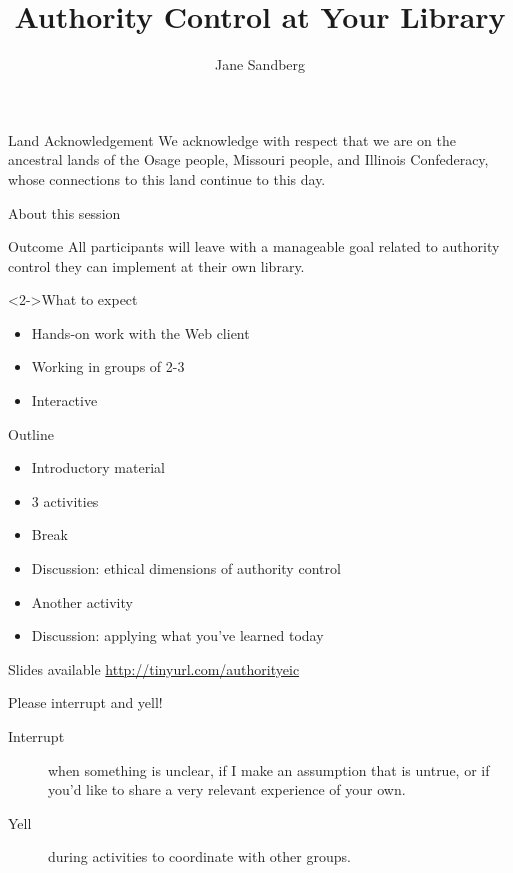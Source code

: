 \documentclass{beamer}
\begin{document}
\title{Authority Control at Your Library}
\author{Jane Sandberg}


\begin{frame}
 \titlepage
\end{frame}


\begin{frame}{Land Acknowledgement}
We acknowledge with respect that we are on the ancestral lands of the Osage people, Missouri people, and Illinois Confederacy, whose connections to this land continue to this day.

\end{frame}


\begin{frame}{About this session}
\begin{block}{Outcome}
 All participants will leave with a manageable goal related to authority control they can implement at their own library.
\end{block}
\begin{block}<2->{What to expect}
\begin{itemize}
 \item Hands-on work with the Web client
 \item Working in groups of 2-3
 \item Interactive
\end{itemize}
\end{block}


\end{frame}


\begin{frame}{Outline}
\begin{itemize}
 \item Introductory material
 \item 3 activities
 \item Break
 \item Discussion: ethical dimensions of authority control
 \item Another activity
 \item Discussion: applying what you've learned today
\end{itemize}
\begin{block}{Slides available}
\url{http://tinyurl.com/authorityeic}
\end{block}
\end{frame}

\begin{frame}{Please interrupt and yell!}

 \begin{description}
  \item[Interrupt] when something is unclear, if I make an assumption that is untrue, or if you'd like to share a very relevant experience of your own.
  \item[Yell] during activities to coordinate with other groups.
 \end{description}


\end{frame}
\end{document}
